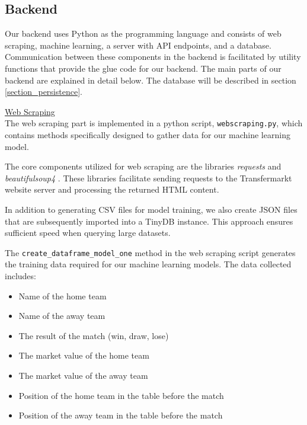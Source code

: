 \documentclass[conference,a4paper,flushend]{cs-techrep}
\begin{document}

\subsection{Backend} \label{section_backend}
Our backend uses Python as the programming language and consists of web scraping, machine learning, a server with API endpoints, and a database. Communication between these components in the backend is facilitated by utility functions that provide the glue code for our backend. The main parts of our backend are explained in detail below. The database will be described in section \ref{section_persistence}.

\vspace{0.15cm}
\underline{Web Scraping}\vspace{0.1cm}\\
The web scraping part is implemented in a python script, \texttt{webscraping.py}, which contains methods specifically designed to gather data for our machine learning model.

The core components utilized for web scraping are the libraries \emph{requests} \cite{noauthor_requests_nodate} and \emph{beautifulsoup4} \cite{noauthor_beautifulsoup4_nodate}. These libraries facilitate sending requests to the Transfermarkt website server and processing the returned HTML content.

In addition to generating CSV files for model training, we also create JSON files that are subsequently imported into a TinyDB instance. This approach ensures sufficient speed when querying large datasets.

The \texttt{create\_dataframe\_model\_one} method in the web scraping script generates the training data required for our machine learning models. The data collected includes:

\begin{itemize}
    \item Name of the home team
    \item Name of the away team
    \item The result of the match (win, draw, lose)
    \item The market value of the home team
    \item The market value of the away team
    \item Position of the home team in the table before the match
    \item Position of the away team in the table before the match
\end{itemize}
\end{document}
